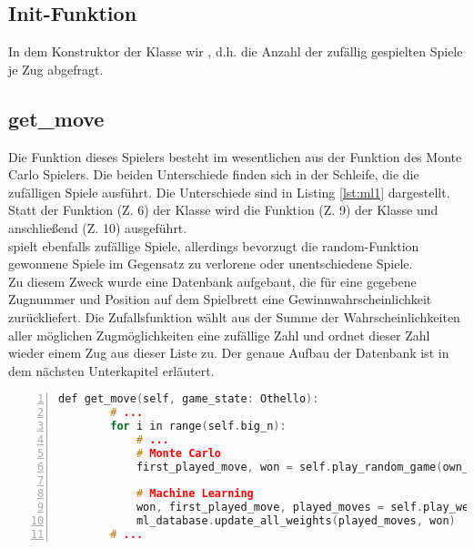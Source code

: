 \subsection{Init-Funktion}
In dem Konstruktor der Klasse  wir , d.h. die Anzahl der zufällig gespielten Spiele je Zug abgefragt.

\subsection{get\_move}
Die  Funktion dieses Spielers besteht im wesentlichen aus der Funktion  des Monte Carlo Spielers. Die beiden Unterschiede finden sich in der Schleife, die die zufälligen Spiele ausführt. Die Unterschiede sind in Listing \ref{lst:ml1} dargestellt. 
Statt der Funktion  (Z. 6) der  Klasse wird die Funktion  (Z. 9) der Klasse  und anschließend  (Z. 10) ausgeführt. 
\\ spielt ebenfalls zufällige Spiele, allerdings bevorzugt die random-Funktion gewonnene Spiele im Gegensatz zu verlorene oder unentschiedene Spiele.
\\ Zu diesem Zweck wurde eine Datenbank aufgebaut, die für eine gegebene Zugnummer und Position auf dem Spielbrett eine Gewinnwahrscheinlichkeit zurückliefert. Die Zufallsfunktion wählt aus der Summe der Wahrscheinlichkeiten aller möglichen Zugmöglichkeiten eine zufällige Zahl und ordnet dieser Zahl wieder einem Zug aus dieser Liste zu. Der genaue Aufbau der Datenbank ist in dem nächsten Unterkapitel erläutert.

\begin{lstlisting}[caption = {get\_move Funktion des Alpha-Beta Spielers}, language = cpp, captionpos = t , numbers=left, label={lst:ml1}]
    def get_move(self, game_state: Othello):
		# ...
        for i in range(self.big_n): 
			# ... 
			# Monte Carlo
			first_played_move, won = self.play_random_game(own_symbol, simulated_game)

			# Machine Learning
			won, first_played_move, played_moves = self.play_weighted_random_game(own_symbol, simulated_game)
			ml_database.update_all_weights(played_moves, won)
		# ...
\end{lstlisting}
